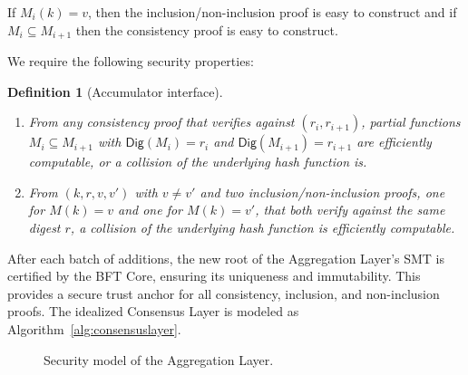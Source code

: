 \documentclass[11pt]{article}
\newtheorem{definition}{Definition}
\begin{document}
If $M_i(k)=v$, then the inclusion/non-inclusion proof is easy to construct and if $M_{i}\subseteq M_{i+1}$ then the consistency proof is easy to construct.

We require the following security properties:

\begin{definition}[Accumulator interface]
\begin{enumerate}[nosep,label=(\roman*)]
  \item From any consistency proof that verifies against $(r_i,r_{i+1})$, partial functions $M_i\subseteq M_{i+1}$ with $\mathsf{Dig}(M_i)=r_i$ and $\mathsf{Dig}(M_{i+1})=r_{i+1}$ are efficiently computable, or a collision of the underlying hash function is.
  \item From $(k,r,v,v')$ with $v\neq v'$ and two inclusion/non-inclusion proofs, one for $M(k)=v$ and one for $M(k)=v'$, that both verify against the same digest $r$, a collision of the underlying hash function is efficiently computable.
\end{enumerate}
\label{def:append-only-accumulator}
\end{definition}

After each batch of additions, the new root of the Aggregation Layer's SMT is certified by the BFT Core, ensuring its uniqueness and immutability. This provides a secure trust anchor for all consistency, inclusion, and non-inclusion proofs. The idealized Consensus Layer is modeled as Algorithm~\ref{alg:consensuslayer}.


\begin{figure}[!htbp]
    \centering
{}
    \caption{Security model of the Aggregation Layer.}\label{fig:model}
\end{figure}
\end{document}
